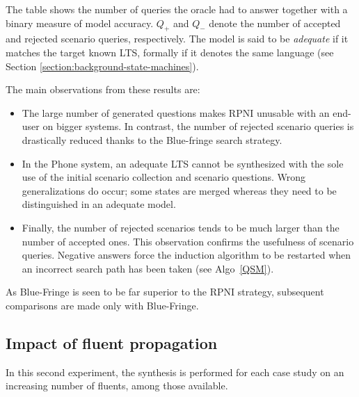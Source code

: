 The table shows the number of queries the oracle had to answer together with a binary measure of model accuracy. $Q_+$ and $Q_-$ denote the number of accepted and rejected scenario queries, respectively. The model is said to be \emph{adequate} if it matches the target known LTS, formally if it denotes the same language (see Section \ref{section:background-state-machines}). 

The main observations from these results are:
\begin{itemize}
\item The large number of generated questions makes RPNI unusable with an end-user on bigger systems. In contrast, the number of rejected scenario queries is drastically reduced thanks to the Blue-fringe search strategy. 
\item In the Phone system, an adequate LTS cannot be synthesized with the sole use of the initial scenario collection and scenario questions. Wrong generalizations do occur; some states are merged whereas they need to be distinguished in an adequate model.
\item Finally, the number of rejected scenarios tends to be much larger than the number of accepted ones. This observation confirms the usefulness of scenario queries. Negative answers force the induction algorithm to be restarted when an incorrect search path has been taken (see Algo~\ref{QSM}).
\end{itemize}

As Blue-Fringe is seen to be far superior to the RPNI strategy, subsequent comparisons are made only with Blue-Fringe.


\subsection{Impact of fluent propagation}

In this second experiment, the synthesis is performed for each case study on an increasing number of fluents, among those available.

